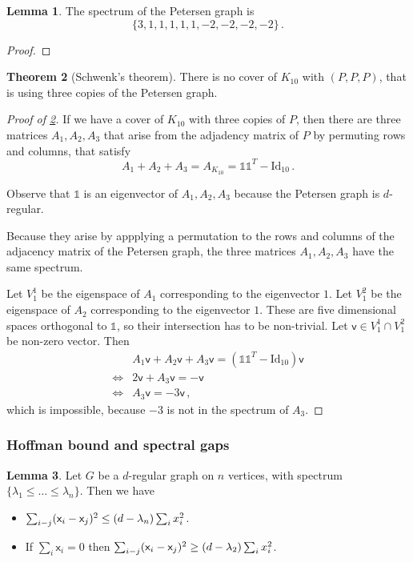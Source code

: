 \documentclass[12pt]{amsart}
\theoremstyle{definition}
\newtheorem{thm}{Theorem}[section]
\newtheorem{lm}[thm]{Lemma}
\newcommand{\vv}{\mathsf{v}}
\newcommand{\vx}{\mathsf{x}}
\newcommand{\Id}{\mathrm{Id}}
\begin{document}
\begin{lm}
The spectrum of the Petersen graph is 
$$ \{ 3, 1, 1, 1, 1, 1, -2, -2, -2, -2 \} \, .$$
\end{lm}

\begin{proof}

\end{proof}


\begin{thm}[Schwenk's theorem]\label{thm:schwenk}
There is no cover of $K_{10}$ with $(P, P, P)$, that is using three copies of the Petersen graph.
\end{thm}


\begin{proof}[Proof of \cref{thm:schwenk}]
If we have a cover of $K_{10}$ with three copies of $P$, then there are three matrices $A_1, A_2, A_3$ that arise from the adjadency matrix of $P$ by permuting rows and columns, that satisfy
$$A_1 + A_2 + A_3 = A_{K_{10}} = \mathbb{1}\mathbb{1}^T - \Id_{10}\, . $$

Observe that $\mathbb{1}$ is an eigenvector of $A_1, A_2, A_3$ because the Petersen graph is $d$-regular.

Because they arise by appplying a permutation to the rows and columns of the adjacency matrix of the Petersen graph, the three matrices $A_1, A_2, A_3 $ have the same spectrum.

Let $V^1_1$ be the eigenspace of $A_1$ corresponding to the eigenvector $1$.
Let $V^2_1$ be the eigenspace of $A_2$ corresponding to the eigenvector $1$.
These are five dimensional spaces orthogonal to $\mathbb{1}$, so their intersection has to be non-trivial.
Let $\vv \in V^1_1 \cap V^2_1$ be non-zero vector.
Then
\begin{align*}
& A_1 \vv + A_2 \vv + A_3 \vv  = (\mathbb{1}\mathbb{1}^T - \Id_{10}) \vv \\
\Leftrightarrow & 2 \vv + A_3 \vv = - \vv \\
\Leftrightarrow & A_3 \vv = - 3 \vv \, ,
\end{align*}
which is impossible, because $-3$ is not in the spectrum of $A_3$.
\end{proof}


\subsubsection*{Hoffman bound and spectral gaps}


\begin{lm}\label{lm:spectral_ineq}
Let $G$ be a $d$-regular graph on $n$ vertices, with spectrum $\{ \lambda_1 \leq \ldots \leq \lambda_n\}$.
Then we have
\begin{itemize}
\item $\sum_{i \-- j} (\vx_i - \vx_j)^2 \leq (d - \lambda_n)\sum_i x_i^2$.

\item If $\sum_i \vx_i = 0$ then $\sum_{i \-- j} (\vx_i - \vx_j)^2 \geq (d - \lambda_2)\sum_i x_i^2$.
\end{itemize}
\end{lm}
\end{document}
